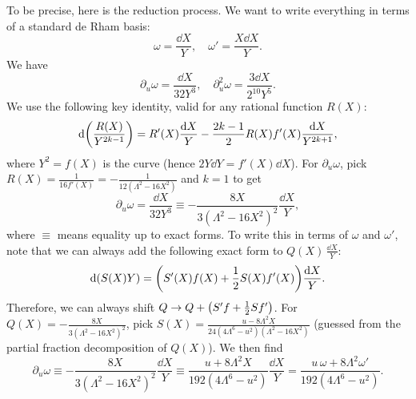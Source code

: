 \documentclass[11pt, a4paper]{article}
\numberwithin{equation}{section}
\begin{document}
To be precise, here is the reduction process. We want to write everything in terms of a standard de Rham basis:
\begin{equation}
  \omega = \frac{\dd{X}}{Y}, \quad \omega' = \frac{X \dd{X}}{Y}.
\end{equation}
We have
\begin{equation}
  \partial_u \omega = \frac{\dd{X}}{32 Y^3}, \quad \partial_u^2 \omega = \frac{3 \dd{X}}{2^{10} Y^5}.
\end{equation}
We use the following key identity, valid for any rational function $R(X)$:
\begin{equation}
  \dd{\qty(\frac{R(X)}{Y^{2k-1}})} = R'(X) \frac{\dd{X}}{Y} - \frac{2k-1}{2} R(X) f'(X) \frac{\dd{X}}{Y^{2k+1}},
\end{equation}
where $Y^2 = f(X)$ is the curve (hence $2 Y \dd{Y} = f'(X) \dd{X}$).
For $\partial_u \omega$, pick $R(X) = \frac{1}{16 f'(X)} = -\frac{1}{12 \left(\Lambda^2-16 X^2\right)}$ and $k=1$ to get
\begin{equation}
  \partial_u \omega = \frac{\dd{X}}{32 Y^3} \equiv -\frac{8 X}{3 \left(\Lambda^2-16 X^2\right)^2} \frac{\dd{X}}{Y},
\end{equation}
where $\equiv$ means equality up to exact forms.
To write this in terms of $\omega$ and $\omega'$, note that we can always add the following exact form to $Q(X)\,\frac{\dd{X}}{Y}$:
\begin{equation}
  \dd{(S(X) Y)} = \qty(S'(X) f(X) + \frac{1}{2} S(X) f'(X)) \frac{\dd{X}}{Y}.
\end{equation}
Therefore, we can always shift $Q \to Q + \qty(S' f + \frac{1}{2} S f')$. For $Q(X) = -\frac{8 X}{3 \left(\Lambda^2-16 X^2\right)^2}$, pick
$S(X) = \frac{u-8 \Lambda^2 X}{24 \left(4 \Lambda^6-u^2\right) \left(\Lambda^2-16 X^2\right)}$ (guessed from the partial fraction decomposition of $Q(X)$). We then find
\begin{equation}
  \partial_u \omega \equiv -\frac{8 X}{3 \left(\Lambda^2-16 X^2\right)^2} \frac{\dd{X}}{Y}
  \equiv \frac{u+8 \Lambda^2 X}{192 (4\Lambda^6 - u^2)} \frac{\dd{X}}{Y}
  = \frac{u \, \omega + 8 \Lambda^2 \omega'}{192 (4\Lambda^6 - u^2)}.
\end{equation}
\end{document}
